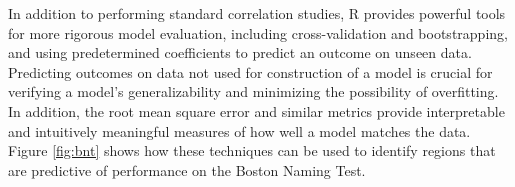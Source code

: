 In addition to performing standard correlation studies, R provides powerful tools for more rigorous model evaluation, including cross-validation and bootstrapping, and using predetermined coefficients to predict an outcome on unseen data.  Predicting outcomes on data not used for construction of a model is crucial for verifying a model's generalizability and minimizing the possibility of overfitting.  In addition, the root mean square error and similar metrics provide interpretable and intuitively meaningful measures of how well a model matches the data.  Figure \ref{fig:bnt} shows how these techniques can be used to identify regions that are predictive of performance on the Boston Naming Test. 